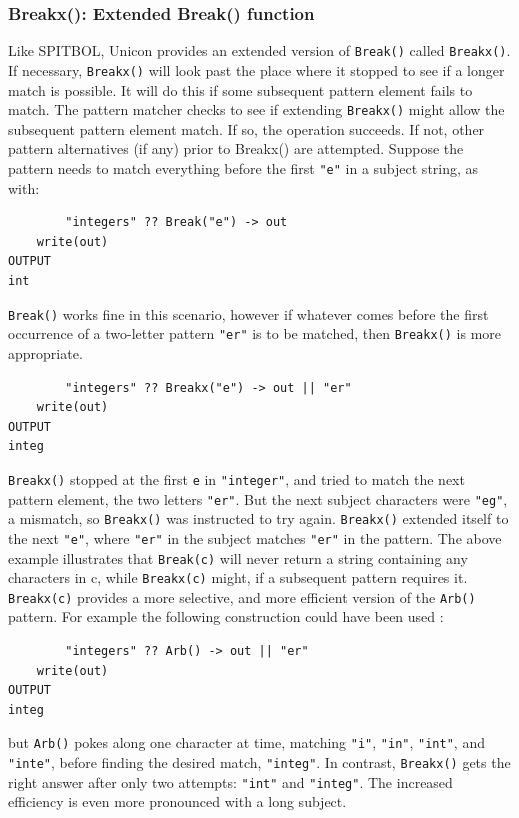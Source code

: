 \documentclass[letterpaper,12pt]{article}
\begin{document}
\subsubsection{Breakx(): Extended Break() function}

Like SPITBOL, Unicon provides an extended version of \texttt{Break()} called
\texttt{Breakx()}. If necessary, {\tt Breakx()} will look past the
place where it
stopped to see if a longer match is possible. It will do this if some
subsequent pattern element fails to match. The pattern matcher checks
to see if extending {\tt Breakx()} might allow the subsequent pattern
element match. If so, the operation succeeds. If not, other pattern
alternatives (if any) prior to Breakx() are attempted.  Suppose the
pattern needs to match everything before the first \texttt{"e"} in a
subject string, as with:

\begin{verbatim}
        "integers" ?? Break("e") -> out
	write(out)
OUTPUT
int
\end{verbatim}

{\tt Break()} works fine in this scenario, however if whatever comes before
the first occurrence of a two-letter pattern {\tt "er"} is to be matched,
then {\tt Breakx()} is more appropriate.

\begin{verbatim}
        "integers" ?? Breakx("e") -> out || "er"
	write(out)
OUTPUT
integ
\end{verbatim}

{\tt Breakx()} stopped at the first {\tt e} in {\tt "integer"},
and tried to match
the next pattern element, the two letters {\tt "er"}. But the next subject
characters were {\tt "eg"}, a mismatch, so {\tt Breakx()} was instructed to try
again. {\tt Breakx()} extended itself to the next {\tt "e"}, where
{\tt "er"} in the
subject matches {\tt "er"} in the pattern.  The above example illustrates
that {\tt Break(c)} will never return a string containing any characters in
c, while {\tt Breakx(c)} might, if a subsequent pattern requires it.
{\tt Breakx(c)} provides a more selective, and more efficient version of
the {\tt Arb()} pattern. For example the following construction could have
been used :

\begin{verbatim}
        "integers" ?? Arb() -> out || "er"
	write(out)
OUTPUT
integ
\end{verbatim}

but {\tt Arb()} pokes along one character at time, matching
{\tt "i"}, {\tt "in"},
{\tt "int"}, and {\tt "inte"}, before finding the desired match,
{\tt "integ"}. In
contrast, {\tt Breakx()} gets the right answer after only two attempts:
{\tt "int"} and {\tt "integ"}. The increased efficiency is even more pronounced
with a long subject.
\end{document}
